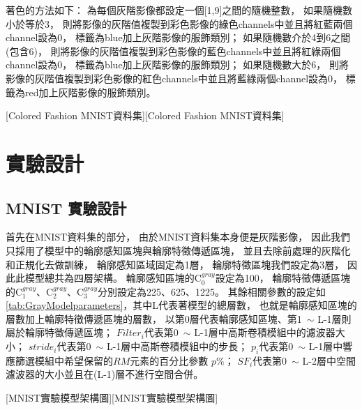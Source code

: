\documentclass[class=NCU\_thesis, crop=false]{standalone}
\begin{document}
    著色的方法如下：
    為每個灰階影像都設定一個[1,9]之間的隨機整數，
    如果隨機數小於等於3，
    則將影像的灰階值複製到彩色影像的綠色channels中並且將紅藍兩個channel設為0，
    標籤為blue加上灰階影像的服飾類別；
    如果隨機數介於4到6之間(包含6)，
    則將影像的灰階值複製到彩色影像的藍色channels中並且將紅綠兩個channel設為0，
    標籤為blue加上灰階影像的服飾類別；
    如果隨機數大於6，
    則將影像的灰階值複製到彩色影像的紅色channels中並且將藍綠兩個channel設為0，
    標籤為red加上灰階影像的服飾類別。

    [Colored Fashion MNIST資料集][Colored Fashion MNIST資料集]
    \pagebreak
\section{實驗設計}
    \subsection{MNIST 實驗設計}
    首先在MNIST資料集的部分，
    由於MNIST資料集本身便是灰階影像，
    因此我們只採用了模型中的輪廓感知區塊與輪廓特徵傳遞區塊，
    並且去除前處理的灰階化和正規化去做訓練，
    輪廓感知區域固定為1層，
    輪廓特徵區塊我們設定為3層，
    因此此模型總共為四層架構。
    輪廓感知區塊的C$^{gray}_{0}$設定為100，
    輪廓特徵傳遞區塊的C$^{gray}_{1}$、C$^{gray}_{2}$、C$^{gray}_{3}$分別設定為225、625、1225。
    其餘相關參數的設定如\cref{tab:GrayModelparameters}，其中L代表著模型的總層數，
    也就是輪廓感知區塊的層數加上輪廓特徵傳遞區塊的層數，
    以第0層代表輪廓感知區塊、第1~$\sim$ L-1層則屬於輪廓特徵傳遞區塊；
    $Filter_{i}$代表第0~$\sim$ L-1層中高斯卷積模組中的濾波器大小；
    $stride_{i}$代表第0~$\sim$ L-1層中高斯卷積模組中的步長；
    $p_{i}$代表第0~$\sim$ L-1層中響應篩選模組中希望保留的$RM$元素的百分比參數 $p\%$；
    $SF_{i}$代表第0~$\sim$ L-2層中空間濾波器的大小並且在(L-1)層不進行空間合併。

    [MNIST實驗模型架構圖][MNIST實驗模型架構圖]
\end{document}
